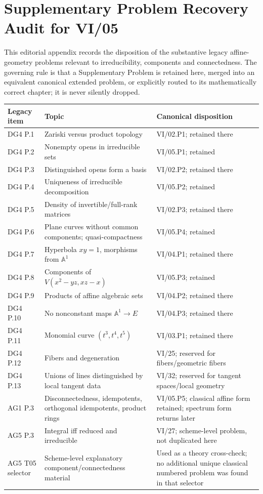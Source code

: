 \chapter*{Supplementary Problem Recovery Audit for VI/05}

This editorial appendix records the disposition of the substantive legacy affine-geometry
problems relevant to irreducibility, components and connectedness.  The governing rule is
that a Supplementary Problem is retained here, merged into an equivalent canonical extended problem, or
explicitly routed to its mathematically correct chapter; it is never silently dropped.

\begin{longtable}{p{}p{}p{}}
\toprule
\textbf{Legacy item} & \textbf{Topic} & \textbf{Canonical disposition}\\
\midrule
DG4 P.1 & Zariski versus product topology & VI/02.P1; retained there\\
DG4 P.2 & Nonempty opens in irreducible sets & VI/05.P1; retained\\
DG4 P.3 & Distinguished opens form a basis & VI/02.P2; retained there\\
DG4 P.4 & Uniqueness of irreducible decomposition & VI/05.P2; retained\\
DG4 P.5 & Density of invertible/full-rank matrices & VI/02.P3; retained there\\
DG4 P.6 & Plane curves without common components; quasi-compactness & VI/05.P4; retained\\
DG4 P.7 & Hyperbola \(xy=1\), morphisms from \(\mathbb A^1\) & VI/04.P1; retained there\\
DG4 P.8 & Components of \(V(x^2-yz,xz-x)\) & VI/05.P3; retained\\
DG4 P.9 & Products of affine algebraic sets & VI/04.P2; retained there\\
DG4 P.10 & No nonconstant maps \(\mathbb A^1\to E\) & VI/04.P3; retained there\\
DG4 P.11 & Monomial curve \((t^3,t^4,t^5)\) & VI/03.P1; retained there\\
DG4 P.12 & Fibers and degeneration & VI/25; reserved for fibers/geometric fibers\\
DG4 P.13 & Unions of lines distinguished by local tangent data & VI/32; reserved for tangent spaces/local geometry\\
AG1 P.3 & Disconnectedness, idempotents, orthogonal idempotents, product rings & VI/05.P5; classical affine form retained; spectrum form returns later\\
AG5 P.3 & Integral iff reduced and irreducible & VI/27; scheme-level problem, not duplicated here\\
AG5 T05 selector & Scheme-level explanatory component/connectedness material & Used as a theory cross-check; no additional unique classical numbered problem was found in that selector\\
\bottomrule
\end{longtable}

